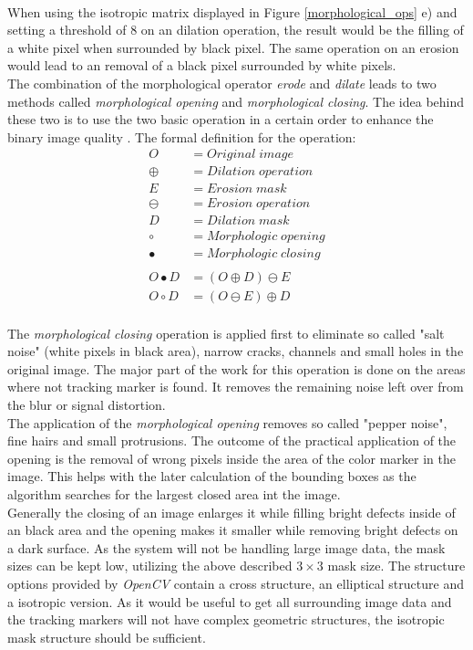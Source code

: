 \\When using the isotropic matrix displayed in Figure \ref{morphological_ops} e) and setting a threshold of 8 on an dilation operation, the result would be the filling of a white pixel when surrounded by black pixel. The same operation on an erosion would lead to an removal of a black pixel surrounded by white pixels.\\
The combination of the morphological operator \textit{erode} and \textit{dilate} leads to two methods called \textit{morphological opening} and \textit{morphological closing}. The idea behind these two is to use the two basic operation in a certain order to enhance the binary image quality \cite[chapter~3.12]{Davies.2017}.
The formal definition for the operation:
\begin{equation}
 \begin{split}
O&=Original\; image \\
\oplus&= Dilation\; operation\\
E&=Erosion\; mask\\
\ominus&= Erosion\; operation\\
D&=Dilation\; mask\\
\circ&= Morphologic\; opening\\
\bullet&= Morphologic\; closing\\
\\
O\bullet D&=(O\oplus D)\ominus E\\
O\circ D&=(O \ominus E)\oplus D\\
\end{split}
\end{equation}

The \textit{morphological closing} operation is applied first to eliminate so called "salt noise" (white pixels in black area), narrow cracks, channels and small holes in the original image. The major part of the work for this operation is done on the areas where not tracking marker is found. It removes the remaining noise left over from the blur or signal distortion.\\
The application of the \textit{morphological opening} removes so called "pepper noise", fine hairs and small protrusions. The outcome of the practical application of the opening is the removal of wrong pixels inside the area of the color marker in the image. This helps with the later calculation of the bounding boxes as the algorithm searches for the largest closed area int the image.\\
Generally the closing of an image enlarges it while filling bright defects inside of an black area and the opening makes it smaller while removing bright defects on a dark surface.
As the system will not be handling large image data, the mask sizes can be kept low, utilizing the above described $3\times 3$ mask size. The structure options provided by \textit{OpenCV} contain a cross structure, an elliptical structure and a isotropic version. As it would be useful to get all surrounding image data and the tracking markers will not have complex geometric structures, the isotropic mask structure should be sufficient.
